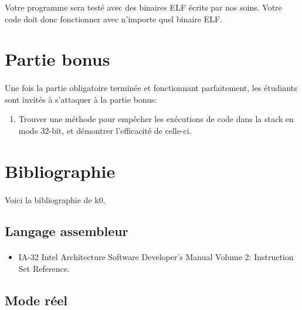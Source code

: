 \documentclass[10pt,a4wide]{article}
\begin{document}
Votre programme sera test\'e avec des binaires ELF \'ecrits par nos soins.
Votre code doit donc fonctionner avec n'importe quel binaire ELF.

\section{Partie bonus}

\paragraph{}

Une fois la partie obligatoire termin\'ee et fonctionnant parfaitement, les
\'etudiants sont invit\'es \`a s'attaquer \`a la partie bonus:

\begin{enumerate}
\item Trouver une m\'ethode pour emp\^echer les ex\'ecutions de code dans
      la stack en mode 32-bit, et d\'emontrer l'efficacit\'e de celle-ci.
\end{enumerate}

\section{Bibliographie}

\paragraph{}

Voici la bibliographie de k0.

\subsection{Langage assembleur}

\paragraph{}

\begin{itemize}
\item IA-32 Intel Architecture Software Developer's Manual Volume 2: 
      Instruction Set Reference.
\end{itemize}

\subsection{Mode r\'eel}
\end{document}
